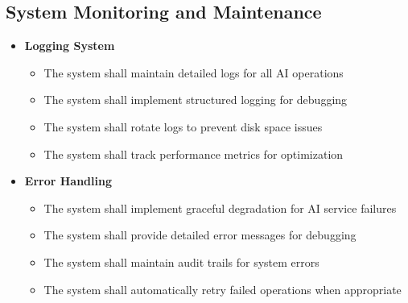 \subsection{System Monitoring and Maintenance}
\begin{itemize}
    \item \textbf{Logging System}
    \begin{itemize}
        \item The system shall maintain detailed logs for all AI operations
        \item The system shall implement structured logging for debugging
        \item The system shall rotate logs to prevent disk space issues
        \item The system shall track performance metrics for optimization
    \end{itemize}
    
    \item \textbf{Error Handling}
    \begin{itemize}
        \item The system shall implement graceful degradation for AI service failures
        \item The system shall provide detailed error messages for debugging
        \item The system shall maintain audit trails for system errors
        \item The system shall automatically retry failed operations when appropriate
    \end{itemize}
\end{itemize}

